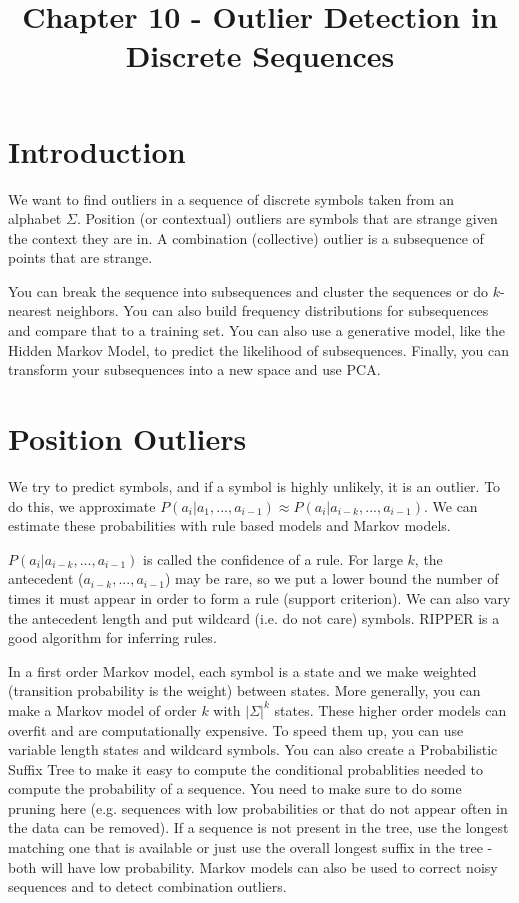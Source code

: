 \documentclass[a4paper]{article}
\title{Chapter 10 - Outlier Detection in Discrete Sequences}
\date{}
\begin{document}
\maketitle

\section{Introduction}
We want to find outliers in a sequence of discrete symbols taken from an
alphabet $\Sigma$. Position (or contextual) outliers are symbols that are
strange given the context they are in. A combination (collective) outlier is a
subsequence of points that are strange.

You can break the sequence into subsequences and cluster the sequences or
do $k$-nearest neighbors. You can also build frequency distributions for
subsequences and compare that to a training set. You can also use a generative
model, like the Hidden Markov Model, to predict the likelihood of subsequences.
Finally, you can transform your subsequences into a new space and use PCA.

\section{Position Outliers}
We try to predict symbols, and if a symbol is highly unlikely, it is an outlier.
To do this, we approximate $P(a_i | a_1, ..., a_{i-1}) \approx
P(a_i | a_{i-k}, ..., a_{i-1})$. We can estimate these probabilities with
rule based models and Markov models.

$P(a_i | a_{i-k}, ..., a_{i-1})$ is called the confidence of a rule. For large
$k$, the antecedent ($a_{i-k}, ..., a_{i-1}$) may be rare, so we put a lower
bound the number of times it must appear in order to form a rule (support
criterion). We can also vary the antecedent length and put wildcard (i.e.
do not care) symbols. RIPPER is a good algorithm for inferring rules.

In a first order Markov model, each symbol is a state and we make weighted
(transition probability is the weight) between states. More generally, you
can make a Markov model of order $k$ with $|\Sigma|^k$ states. These higher
order models can overfit and are computationally expensive. To speed them
up, you can use variable length states and wildcard symbols. You can also create
a Probabilistic Suffix Tree to make it easy to compute the conditional
probablities needed to compute the probability of a sequence. You need to make
sure to do some pruning here (e.g. sequences with low probabilities or
that do not appear often in the data can be removed). If a sequence is not
present in the tree, use the longest matching one that is available or just
use the overall longest suffix in the tree - both will have low probability.
Markov models can also be used to correct noisy sequences and to detect
combination outliers.
\end{document}
